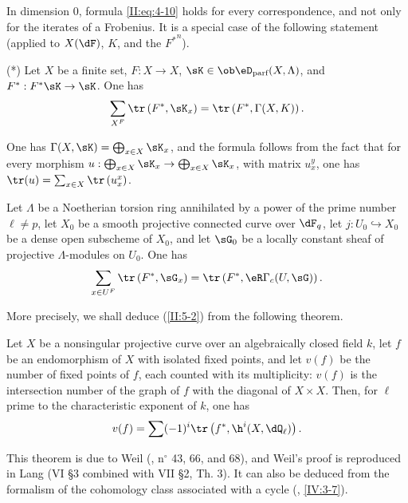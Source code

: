 \documentclass[oneside]{book}
\begin{document}
In dimension $0$, formula \eqref{II:eq:4-10} holds for every correspondence,
and not only for the iterates of a Frobenius. It is a special case of the
following statement (applied to $X(\dF)$, $K$, and the ${F^*}^n$).

(*) Let $X$ be a finite set, $F:X\to X$,
$\sK\in\ob\eD_\text{parf}(X,\Lambda)$, and $F^*:F^* \sK\to \sK$. One has
\[
  \sum_{X^F} \tr\left(F^*,\sK_x\right) = \tr\left(F^*,\Gamma(X,K)\right) \text{.}
\]

One has $\Gamma(X,\sK)=\bigoplus_{x\in X} \sK_x$, and the formula follows
from the fact that for every morphism
$u:\bigoplus_{x\in X} \sK_x\to \bigoplus_{x\in X} \sK_x$, with matrix
$u_x^y$, one has $\tr(u)=\sum_{x\in X} \tr\left(u_x^x\right)$.






\begin{lemma_}\label{II:5-2}
Let $\Lambda$ be a Noetherian torsion ring annihilated by a power of the prime
number $\ell\ne p$, let $X_0$ be a smooth projective connected curve over
$\dF_q$, let $j:U_0\hookrightarrow X_0$ be a dense open subscheme of $X_0$,
and let $\sG_0$ be a locally constant sheaf of projective
$\Lambda$-modules on $U_0$. One has
\[
  \sum_{x\in U^F} \tr\left(F^*,\sG_x\right) = \tr\left(F^*,\eR\Gamma_c(U,\sG)\right) \text{.}
\]
\end{lemma_}

More precisely, we shall deduce (\ref{II:5-2}) from the following theorem.






\begin{theorem_}\label{II:5-3}
Let $X$ be a nonsingular projective curve over an algebraically closed field
$k$, let $f$ be an endomorphism of $X$ with isolated fixed points, and let
$v(f)$ be the number of fixed points of $f$, each counted with its
multiplicity: $v(f)$ is the intersection number of the graph of $f$ with the
diagonal of $X\times X$. Then, for $\ell$ prime to the characteristic
exponent of $k$, one has
\[
  v(f) = \sum (-1)^i \tr\left(f^*,\h^i(X,\dQ_\ell)\right) \text{.}
\]
\end{theorem_}

This theorem is due to Weil (\cite{we48}, n$^\circ$ 43, 66, and 68), and Weil's
proof is reproduced in Lang \cite{la83} (VI \S3 combined with VII \S2,
Th. 3). It can also be deduced from the formalism of the cohomology class
associated with a cycle (, \ref{IV:3-7}).
\end{document}

